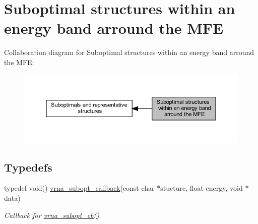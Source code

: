 \hypertarget{group__subopt__wuchty}{}\section{Suboptimal structures within an energy band arround the M\+FE}
\label{group__subopt__wuchty}
Collaboration diagram for Suboptimal structures within an energy band arround the M\+FE\+:
\nopagebreak
\begin{figure}[H]
\begin{center}
\leavevmode
\includegraphics[width=350pt]{group__subopt__wuchty}
\end{center}
\end{figure}
\subsection*{Typedefs}
\begin{DoxyCompactItemize}
\item 
typedef void() \hyperlink{group__subopt__wuchty_gaa0270c66d04f59e750401695b8282e04}{vrna\+\_\+subopt\+\_\+callback}(const char $\ast$stucture, float energy, void $\ast$data)
\begin{DoxyCompactList}\small\item\em Callback for \hyperlink{group__subopt__wuchty_ga1053837e6b6f158093508f8a70998352}{vrna\+\_\+subopt\+\_\+cb()} \end{DoxyCompactList}\end{DoxyCompactItemize}
